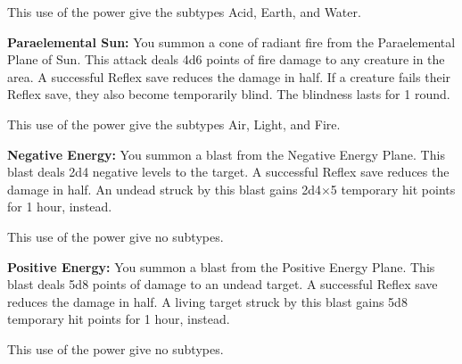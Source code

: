 {	This use of the power give the subtypes Acid, Earth, and Water.

	\textbf{Paraelemental Sun:} You summon a cone of radiant fire from the Paraelemental Plane of Sun. This attack deals 4d6 points of fire damage to any creature in the area. A successful Reflex save reduces the damage in half. If a creature fails their Reflex save, they also become temporarily blind. The blindness lasts for 1 round.

	This use of the power give the subtypes Air, Light, and Fire.

	\textbf{Negative Energy:} You summon a blast from the Negative Energy Plane. This blast deals 2d4 negative levels to the target. A successful Reflex save reduces the damage in half. An undead struck by this blast gains 2d4$\times$5 temporary hit points for 1 hour, instead.

	This use of the power give no subtypes.
	
	\textbf{Positive Energy:} You summon a blast from the Positive Energy Plane. This blast deals 5d8 points of damage to an undead target. A successful Reflex save reduces the damage in half. A living target struck by this blast gains 5d8 temporary hit points for 1 hour, instead.

	This use of the power give no subtypes.
}
